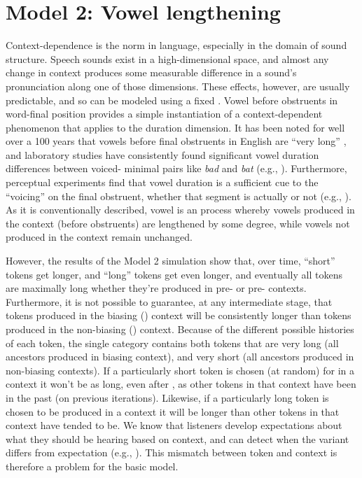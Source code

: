 \section{\label{subsec:Model-2:-Lengthening}Model 2: Vowel lengthening}

Context-dependence is the norm in language, especially in the domain
of sound structure. Speech sounds exist in a high-dimensional space,
and almost any change in context produces some measurable difference
in a sound's pronunciation along one of those dimensions. These effects,
however, are usually predictable, and so can be modeled using a fixed
. Vowel  before  obstruents in word-final position
provides a simple instantiation of a context-dependent phenomenon
that applies to the duration dimension. It has been noted for well
over a 100 years that vowels before final  obstruents in English
are “very long” \citep[59]{Sweet1880}, and laboratory
studies have consistently found significant vowel duration differences
between voiced- minimal pairs like \textit{bad} and \textit{bat}
(e.g., \citealt{peterson1960duration,chen1970vowel}). Furthermore,
perceptual experiments find that vowel duration is a sufficient cue
to the “voicing” on the final obstruent, whether that segment
is actually  or not (e.g., \citealt{raphael1972preceding,Klatt1976}).
As it is conventionally described, vowel  is an 
process whereby vowels produced in the  context (before
 obstruents) are lengthened by some degree, while vowels not
produced in the  context remain unchanged.

However, the results of the Model 2 simulation show that, over time,
“short” tokens get longer, and “long” tokens get even
longer, and eventually all tokens are maximally long whether they're
produced in pre- or pre- contexts. Furthermore, it
is not possible to guarantee, at any intermediate stage, that tokens
produced in the biasing () context will be consistently longer
than tokens produced in the non-biasing () context. Because
of the different possible histories of each token, the single category
contains both tokens that are very long (all ancestors produced in
biasing context), and very short (all ancestors produced in non-biasing
contexts). If a particularly short token is chosen (at random) for
 in a  context it won't be as long, even after ,
as other tokens in that context have been in the past (on previous
iterations). Likewise, if a particularly long token is chosen to be
produced in a  context it will be longer than other tokens
in that context have tended to be. We know that listeners develop
expectations about what they should be hearing based on context, and
can detect when the variant differs from expectation (e.g., \citealp{krakow1988coarticulatory,gaskell1996phonological}).
This mismatch between token and context is therefore a problem for
the basic  model. 

